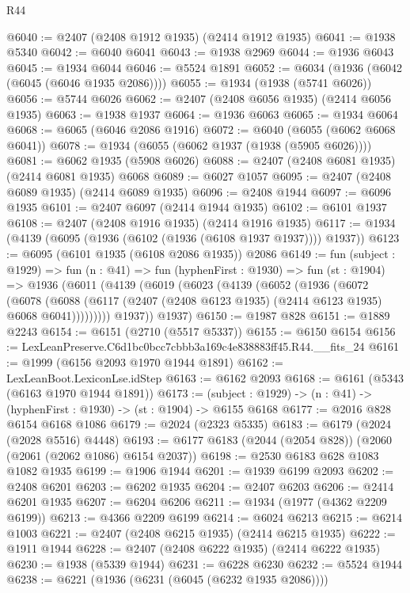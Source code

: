\begin{lexlean}{R44}
\begin{coremodule}
@6040 := @2407 (@2408 @1912 @1935) (@2414 @1912 @1935)
@6041 := @1938 @5340
@6042 := @6040 @6041
@6043 := @1938 @2969
@6044 := @1936 @6043
@6045 := @1934 @6044
@6046 := @5524 @1891
@6052 := @6034 (@1936 (@6042 (@6045 (@6046 @1935 @2086))))
@6055 := @1934 (@1938 (@5741 @6026))
@6056 := @5744 @6026
@6062 := @2407 (@2408 @6056 @1935) (@2414 @6056 @1935)
@6063 := @1938 @1937
@6064 := @1936 @6063
@6065 := @1934 @6064
@6068 := @6065 (@6046 @2086 @1916)
@6072 := @6040 (@6055 (@6062 @6068 @6041))
@6078 := @1934 (@6055 (@6062 @1937 (@1938 (@5905 @6026))))
@6081 := @6062 @1935 (@5908 @6026)
@6088 := @2407 (@2408 @6081 @1935) (@2414 @6081 @1935) @6068
@6089 := @6027 @1057
@6095 := @2407 (@2408 @6089 @1935) (@2414 @6089 @1935)
@6096 := @2408 @1944
@6097 := @6096 @1935
@6101 := @2407 @6097 (@2414 @1944 @1935)
@6102 := @6101 @1937
@6108 := @2407 (@2408 @1916 @1935) (@2414 @1916 @1935)
@6117 := @1934 (@4139 (@6095 (@1936 (@6102 (@1936 (@6108 @1937 @1937)))) @1937))
@6123 := @6095 (@6101 @1935 (@6108 @2086 @1935)) @2086
@6149 := fun (subject : @1929) =>
  fun (n : @41) =>
  fun (hyphenFirst : @1930) =>
  fun (st : @1904) =>
  @1936
    (@6011
      (@4139
        (@6019
          (@6023
            (@4139
              (@6052
                (@1936
                  (@6072
                    (@6078
                      (@6088
                        (@6117 (@2407 (@2408 @6123 @1935) (@2414 @6123 @1935) @6068 @6041)))))))))
          @1937))
      @1937)
@6150 := @1987 @828
@6151 := @1889 @2243
@6154 := @6151 (@2710 (@5517 @5337))
@6155 := @6150 @6154
@6156 := LexLeanPreserve.C6d1bc0bcc7cbbb3a169c4e838883ff45.R44.__fits_24
@6161 := @1999 (@6156 @2093 @1970 @1944 @1891)
@6162 := LexLeanBoot.LexiconLse.idStep
@6163 := @6162 @2093
@6168 := @6161 (@5343 (@6163 @1970 @1944 @1891))
@6173 := (subject : @1929) -> (n : @41) -> (hyphenFirst : @1930) -> (st : @1904) -> @6155 @6168
@6177 := @2016 @828 @6154 @6168 @1086
@6179 := @2024 (@2323 @5335)
@6183 := @6179 (@2024 (@2028 @5516) @4448)
@6193 := @6177 @6183 (@2044 (@2054 @828)) (@2060 (@2061 (@2062 @1086) @6154 @2037))
@6198 := @2530 @6183 @628 @1083 @1082 @1935
@6199 := @1906 @1944
@6201 := @1939 @6199 @2093
@6202 := @2408 @6201
@6203 := @6202 @1935
@6204 := @2407 @6203
@6206 := @2414 @6201 @1935
@6207 := @6204 @6206
@6211 := @1934 (@1977 (@4362 @2209 @6199))
@6213 := @4366 @2209 @6199
@6214 := @6024 @6213
@6215 := @6214 @1003
@6221 := @2407 (@2408 @6215 @1935) (@2414 @6215 @1935)
@6222 := @1911 @1944
@6228 := @2407 (@2408 @6222 @1935) (@2414 @6222 @1935)
@6230 := @1938 (@5339 @1944)
@6231 := @6228 @6230
@6232 := @5524 @1944
@6238 := @6221 (@1936 (@6231 (@6045 (@6232 @1935 @2086))))

\end{coremodule}
\end{lexlean}
